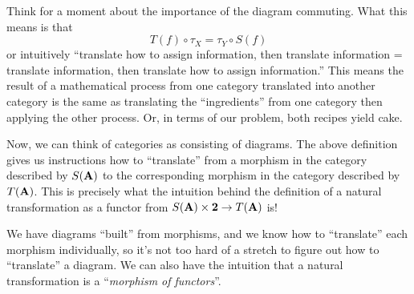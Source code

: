 Think for a moment about the importance of the diagram
commuting. What this means is that
\begin{equation}%
T(f)\circ\tau_{X} = \tau_{Y}\circ S(f)
\end{equation}
or intuitively ``translate how to assign information, then
translate information = translate information, then translate how
to assign information.'' This means the result of a mathematical
process from one category translated into another category is the
same as translating the ``ingredients'' from one category then
applying the other process. Or, in terms of our problem, both
recipes yield cake.

Now, we can think of categories as consisting of diagrams. The
above definition gives us instructions how to ``translate'' from
a morphism in the category described by $S(\mathbf{A})$ to the
corresponding morphism in the category described by
$T(\mathbf{A})$. This is precisely what the intuition behind the
definition of a natural transformation as a functor from
$S(\mathbf{A})\times\mathbf{2}\to{}T(\mathbf{A})$ is!

We have diagrams ``built'' from morphisms, and we know how to
``translate'' each morphism individually, so it's not too hard of
a stretch to figure out how to ``translate'' a diagram. We can
also have the intuition that a natural transformation is a
``\emph{morphism of functors}''.

